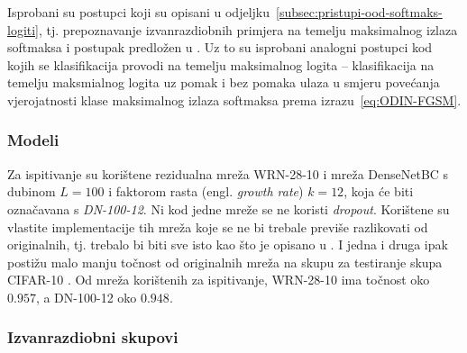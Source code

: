 \documentclass[utf8, diplomski, lmodern]{fer}
\begin{document}
Isprobani su postupci koji su opisani u odjeljku~\ref{subsec:pristupi-ood-softmaks-logiti}, tj. prepoznavanje izvanrazdiobnih primjera na temelju maksimalnog izlaza softmaksa \citep{Hendrycks:2016:BDMOODE} i postupak predložen u \cite{Liang:2017:PDOODENN}. Uz to su isprobani analogni postupci kod kojih se klasifikacija provodi na temelju maksimalnog logita -- klasifikacija na temelju maksmialnog logita uz pomak i bez pomaka ulaza u smjeru povećanja vjerojatnosti klase maksimalnog izlaza softmaksa prema izrazu~\eqref{eq:ODIN-FGSM}.

\subsubsection{Modeli}

Za ispitivanje su korištene rezidualna mreža WRN-28-10 \citep{Zagoruyko:2016:WRN} i mreža DenseNetBC \citep{Huang:2016:DCCN} s dubinom $L=100$ i faktorom rasta (engl. \textit{growth rate}) $k=12$, koja će biti označavana s \textit{DN-100-12}. Ni kod jedne mreže se ne koristi \textit{dropout}. Korištene su vlastite implementacije tih mreža koje se ne bi trebale previše razlikovati od originalnih, tj. trebalo bi biti sve isto kao što je opisano u \citet{Zagoruyko:2016:WRN,Huang:2016:DCCN}. I jedna i druga ipak postižu malo manju točnost od originalnih mreža na skupu za testiranje skupa CIFAR-10 \citep{Krizhevsky:2009:LMLFTI}. Od mreža korištenih za ispitivanje, WRN-28-10 ima točnost oko $0.957$, a DN-100-12 oko $0.948$.

\subsubsection{Izvanrazdiobni skupovi}
\end{document}
